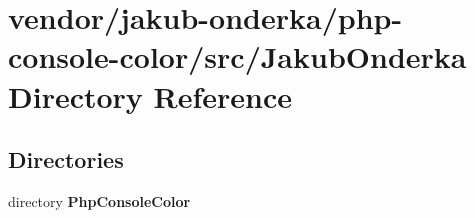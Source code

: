 \section{vendor/jakub-\/onderka/php-\/console-\/color/src/\+Jakub\+Onderka Directory Reference}
\label{dir_26af0f5bc307041c709c9f2114469ef9}
\subsection*{Directories}
\begin{DoxyCompactItemize}
\item 
directory {\bf Php\+Console\+Color}
\end{DoxyCompactItemize}
